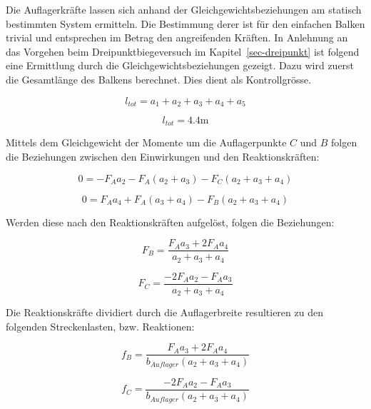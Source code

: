 \documentclass[
  12pt,
  letterpaper,
  egregdoesnotlikesansseriftitles]{scrreprt}
\begin{document}
Die Auflagerkräfte lassen sich anhand der Gleichgewichtsbeziehungen am
statisch bestimmten System ermitteln. Die Bestimmung derer ist für den
einfachen Balken trivial und entsprechen im Betrag den angreifenden
Kräften. In Anlehnung an das Vorgehen beim Dreipunktbiegeversuch im
Kapitel~\ref{sec-dreipunkt} ist folgend eine Ermittlung durch die
Gleichgewichtsbeziehungen gezeigt. Dazu wird zuerst die Gesamtlänge des
Balkens berechnet. Dies dient als Kontrollgrösse.

\begin{equation}l_{tot} = a_{1} + a_{2} + a_{3} + a_{4} + a_{5}\end{equation}

\begin{equation}l_{tot} = 4.4 \text{m}\end{equation}

Mittels dem Gleichgewicht der Momente um die Auflagerpunkte \(C\) und
\(B\) folgen die Beziehungen zwischen den Einwirkungen und den
Reaktionskräften:

\begin{equation}0 = - F_{A} a_{2} - F_{A} \left(a_{2} + a_{3}\right) - F_{C} \left(a_{2} + a_{3} + a_{4}\right)\end{equation}

\begin{equation}0 = F_{A} a_{4} + F_{A} \left(a_{3} + a_{4}\right) - F_{B} \left(a_{2} + a_{3} + a_{4}\right)\end{equation}

Werden diese nach den Reaktionskräften aufgelöst, folgen die
Beziehungen:

\begin{equation}F_{B} = \frac{F_{A} a_{3} + 2 F_{A} a_{4}}{a_{2} + a_{3} + a_{4}}\end{equation}

\begin{equation}F_{C} = \frac{- 2 F_{A} a_{2} - F_{A} a_{3}}{a_{2} + a_{3} + a_{4}}\end{equation}

Die Reaktionskräfte dividiert durch die Auflagerbreite resultieren zu
den folgenden Streckenlasten, bzw. Reaktionen:

\begin{equation}f_{B} = \frac{F_{A} a_{3} + 2 F_{A} a_{4}}{b_{Auflager} \left(a_{2} + a_{3} + a_{4}\right)}\end{equation}

\begin{equation}f_{C} = \frac{- 2 F_{A} a_{2} - F_{A} a_{3}}{b_{Auflager} \left(a_{2} + a_{3} + a_{4}\right)}\end{equation}
\end{document}
